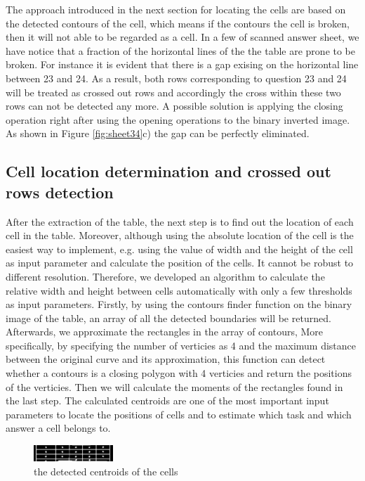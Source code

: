 \documentclass[a4paper,twoside]{article}
\begin{document}
The approach introduced in the next section for locating the cells are based on the detected contours of the cell, which means if the contours the cell is broken, then it will not able to be  regarded as a cell. In a few of scanned answer sheet, we have notice that a fraction of the horizontal lines of the the table are prone to be broken. For instance it is evident that there is a gap exising on the horizontal line between 23 and 24. As a result, both rows corresponding to question 23 and 24 will be treated as crossed out rows and accordingly the cross within these two rows can not be detected any more. A possible solution is applying the closing operation right after using the opening operations to the binary inverted image. As shown in Figure \ref{fig:sheet34}c) the gap can be perfectly eliminated.   

\subsection{Cell location determination and crossed out rows detection }
After the extraction of the table, the next step is to find out the location of each cell in the table. Moreover, although using the absolute location of the cell  is the easiest way to implement, e.g. using the value of width and the height of the cell as input parameter and calculate the position of the cells. It cannot be robust to different resolution. Therefore, we developed an algorithm to calculate the relative width and height between cells automatically with only a few thresholds as input parameters.
Firstly, by using the contours finder function on the binary image of the table, an array of all the detected boundaries will be returned. Afterwards, we approximate the rectangles in the array of contours, More specifically, by specifying the number of verticies as 4 and the maximum distance between the original curve and its approximation, this function can detect whether a contours is a closing polygon with 4 verticies and return the positions of the verticies. Then we will calculate the moments of the rectangles found in the last step. The calculated centroids are one of the most important input parameters to locate the positions of cells and to estimate which task and which answer a cell belongs to.\\
\begin{figure}[!h]
  \centering
  \includegraphics[width=0.5\columnwidth]{Latex/imgs/moments.PNG}
  \caption{the detected centroids of the cells}
  \label{fig:moments}
 \end{figure}
\end{document}

